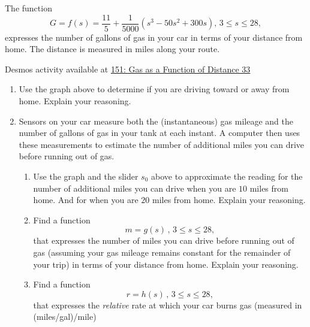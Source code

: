 \documentclass{ximera}
\begin{document}
\begin{question} \label{Qjjjkmmmadgt4e}
The function 
\[
   G = f(s) = \frac{11}{5} +\frac{1}{5000}\left( s^3-50s^2+300s \right) , \, 3\leq s \leq 28 ,
\]
expresses the number of gallons of gas in your car in terms of your distance from home. The distance is measured in miles along your route. 

\begin{onlineOnly}
    \begin{center}
\end{center}
\end{onlineOnly}

Desmos activity available at
\href{https://www.desmos.com/calculator/pb8v4t3cxg}{151: Gas as a Function of Distance 33}

\begin{enumerate}
\item Use the graph above to determine if you are driving toward or away from home. Explain your reasoning.

\item Sensors on your car measure both the (instantaneous) gas mileage and the number of gallons of gas in your tank at each instant. A computer then uses these measurements to estimate the number of additional miles you can drive before running out of gas.

\begin{enumerate}

\item Use the graph and the slider $s_0$ above to approximate the reading for the number of additional miles you can drive when you are $10$ miles from home. And for when you are $20$ miles from home. Explain your reasoning.

\item Find a function 
\[
  m =g(s) \, , \, 3\leq s \leq 28 ,
\]
that expresses the number of miles you can drive before running out of gas (assuming your gas mileage remains constant for the remainder of your trip) in terms of your distance from home. Explain your reasoning. 

\item Find a function 
\[
     r = h(s) \, , \, 3\leq s \leq 28 ,
\]
that expresses the \emph{relative} rate at which your car burns gas (measured in (miles/gal)/mile)
\end{enumerate}
\end{enumerate}

\end{question}
\end{document}
